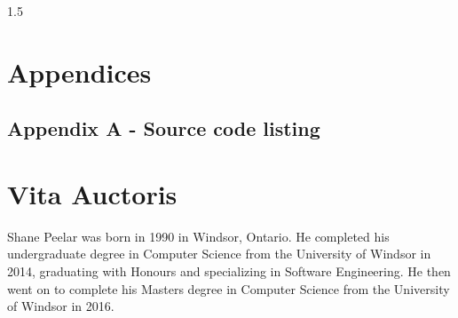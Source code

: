 \documentclass[fleqn, oneside, 12pt]{book}
\theoremstyle{definitionsty}
\newcommand{\uwinonehalfspacelen}{1.5}
\newcommand{\uwindefaultspacelen}{\uwinonehalfspacelen}
\newenvironment{uwindefaultspaceenv}%
{\begin{spacing}{\uwindefaultspacelen}}%
	{\end{spacing}}
\begin{document}
\begin{uwindefaultspaceenv}

\clearpage
\listoftables
\clearpage

\listoffigures
\clearpage

\listofappendices
{}
\clearpage

\listoftheorems[ignoreall,show={definition}]
\clearpage













\printbibliography[heading=bibintoc]

\chapter*{Appendices}
\section*{Appendix A - Source code listing}

\chapter*{Vita Auctoris}

Shane Peelar was born in 1990 in Windsor, Ontario.  He completed his undergraduate degree in Computer Science from the University of Windsor in 2014, graduating with Honours and specializing in Software Engineering.  He then went on to complete his Masters degree in Computer Science from the University of Windsor in 2016.

\end{uwindefaultspaceenv}
\end{document}
